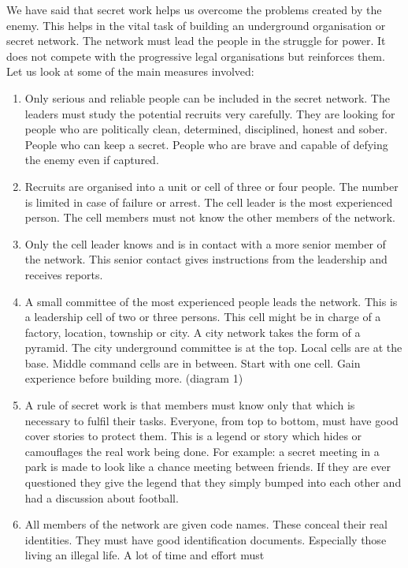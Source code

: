We have said that secret work helps us overcome the problems created by
the enemy. This helps in the vital task of building an underground
organisation or secret network. The network must lead the people in the
struggle for power. It does not compete with the progressive legal
organisations but reinforces them. Let us look at some of the main
measures involved:

\begin{enumerate}
\tightlist
\item
  Only serious and reliable people can be included in the secret
  network. The leaders must study the potential recruits very carefully.
  They are looking for people who are politically clean, determined,
  disciplined, honest and sober. People who can keep a secret. People
  who are brave and capable of defying the enemy even if captured.
\item
  Recruits are organised into a unit or cell of three or four people.
  The number is limited in case of failure or arrest. The cell leader is
  the most experienced person. The cell members must not know the other
  members of the network.
\item
  Only the cell leader knows and is in contact with a more senior member
  of the network. This senior contact gives instructions from the
  leadership and receives reports.
\item
  A small committee of the most experienced people leads the network.
  This is a leadership cell of two or three persons. This cell might be
  in charge of a factory, location, township or city. A city network
  takes the form of a pyramid. The city underground committee is at the
  top. Local cells are at the base. Middle command cells are in between.
  Start with one cell. Gain experience before building more. (diagram 1)
\item
  A rule of secret work is that members must know only that which is
  necessary to fulfil their tasks. Everyone, from top to bottom, must
  have good cover stories to protect them. This is a legend or story
  which hides or camouflages the real work being done. For example: a
  secret meeting in a park is made to look like a chance meeting between
  friends. If they are ever questioned they give the legend that they
  simply bumped into each other and had a discussion about football.
\item
  All members of the network are given code names. These conceal their
  real identities. They must have good identification documents.
  Especially those living an illegal life. A lot of time and effort must

\end{enumerate}
